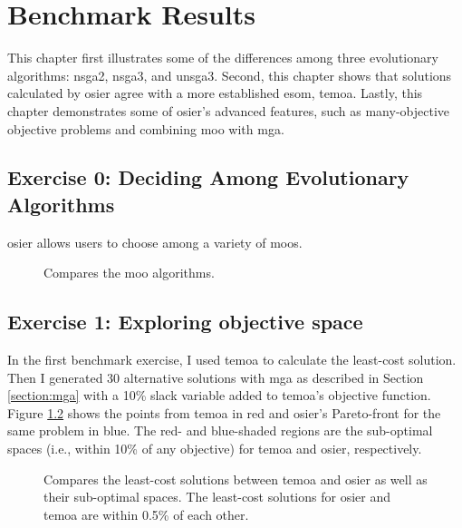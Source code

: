 \chapter{Benchmark Results}
\label{chapter:benchmark-results}

This chapter first illustrates some of the differences among three evolutionary
algorithms: \ac{nsga2}, \ac{nsga3}, and \ac{unsga3}. Second, this chapter shows 
that solutions calculated by \ac{osier} agree with a more established \ac{esom}, 
\ac{temoa}. Lastly, this chapter demonstrates some of \ac{osier}'s advanced features, 
such as many-objective objective problems and combining \ac{moo} with \ac{mga}.

\section{Exercise 0: Deciding Among Evolutionary Algorithms}

\ac{osier} allows users to choose among a variety of \acp{moo}.

\begin{figure}[h]
  \centering
  \resizebox{0.6\columnwidth}{!}{}
  \caption{Compares the \ac{moo} algorithms.}
  \label{fig:algorithm-comparison}
\end{figure}


\section{Exercise 1: Exploring objective space}
In the first benchmark exercise, I used \ac{temoa} to calculate the least-cost
solution. Then I generated 30 alternative solutions with \ac{mga} as described
in Section \ref{section:mga} with a 10\% slack variable added to \ac{temoa}'s
objective function. Figure \ref{fig:temoa-benchmark-01} shows the points from
\ac{temoa} in red and \ac{osier}'s Pareto-front for the same problem in blue.
The red- and blue-shaded regions are the sub-optimal spaces (i.e., within 10\%
of any objective) for \ac{temoa} and \ac{osier}, respectively.

\begin{figure}[h]
  \centering
  \resizebox{0.6\columnwidth}{!}{}
  \caption{Compares the least-cost solutions between \acs{temoa}
  and \acs{osier} as well as their sub-optimal spaces. The least-cost solutions
  for \ac{osier} and \ac{temoa} are within 0.5\% of each other.}
  \label{fig:temoa-benchmark-01}
\end{figure}

